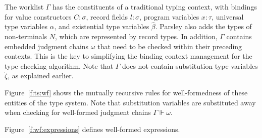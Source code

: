 \documentclass[letterpaper]{article}
\newcommand{\utv}{\alpha}             %
\newcommand{\etv}{{\widehat{\beta}}}  %
\newcommand{\stv}{{\grave{\zeta}}}    %
\begin{document}
The worklist $\Gamma$ has the constituents of a traditional typing
context, with bindings for value constructors $C:\sigma$, record
fields $l:\sigma$, program variables $x:\tau$, universal type
variables $\utv$, and existential type variables $\etv$.  Parsley also
adds the types of non-terminals $N$, which are represented by record
types.  In addition, $\Gamma$ contains embedded judgment chains
$\omega$ that need to be checked within their preceding contexts.
This is the key to simplifying the binding context management for the
type checking algorithm.  Note that $\Gamma$ does not contain
substitution type variables $\stv$, as explained earlier.

Figure~\ref{f:ts:wf} shows the mutually recursive rules for
well-formedness of these entities of the type system.  Note that
substitution variables are substituted away when checking for
well-formed judgment chains $\Gamma\Vdash\omega$.

Figure~\ref{f:wf:expressions} defines well-formed expressions.
\end{document}
